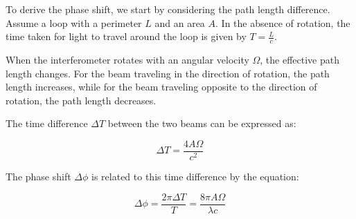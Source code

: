 \documentclass[
  a4paper,
]{book}
\begin{document}
To derive the phase shift, we start by considering the path length
difference. Assume a loop with a perimeter \(L\) and an area \(A\). In
the absence of rotation, the time taken for light to travel around the
loop is given by \(T = \frac{L}{c}\).

When the interferometer rotates with an angular velocity \(\Omega\), the
effective path length changes. For the beam traveling in the direction
of rotation, the path length increases, while for the beam traveling
opposite to the direction of rotation, the path length decreases.

The time difference \(\Delta T\) between the two beams can be expressed
as:

\[
\Delta T = \frac{4 A \Omega}{c^2}
\]

The phase shift \(\Delta \phi\) is related to this time difference by
the equation:

\[
\Delta \phi = \frac{2 \pi \Delta T}{T} = \frac{8 \pi A \Omega}{\lambda c}
\]
\end{document}
